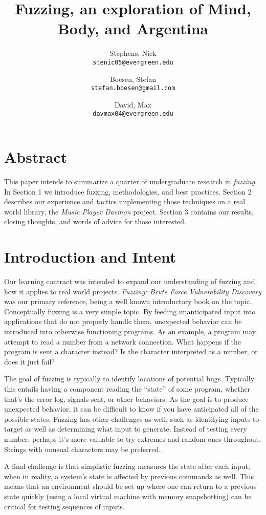 \documentclass[10pt]{article}
\author{
  Stephens, Nick\\
  \texttt{stenic05@evergreen.edu}
  \and
  Boesen, Stefan\\
  \texttt{stefan.boesen@gmail.com}
  \and
  David, Max\\
  \texttt{davmax04@evergreen.edu}
}
\title{Fuzzing, an exploration of Mind, Body, and Argentina}
\begin{document}
  \maketitle

\section*{Abstract}
This paper intends to summarize a quarter of undergraduate research in \emph{fuzzing}. In Section 1 we introduce fuzzing, methodologies, and best practices. Section 2 describes our experience and tactics implementing those techniques on a real world library, the \emph{Music Player Daemon} \cite{mpd} project. Section 3 contains our results, closing thoughts, and words of advice for those interested.

\section{Introduction and Intent}
Our learning contract was intended to expand our understanding of fuzzing and how it applies to real world projects. \emph{Fuzzing: Brute Force Vulnerability Discovery} \cite{sutton07} was our primary reference, being a well known introductory book on the topic. Conceptually fuzzing is a very simple topic. By feeding unanticipated input into applications that do not properly handle them, unexpected behavior can be introduced into otherwise functioning programs. As an example, a program may attempt to read a number from a network connection. What happens if the program is sent a character instead? Is the character interpreted as a number, or does it just fail? 

The goal of fuzzing is typically to identify locations of potential bugs. Typically this entails having a component reading the ``state'' of some program, whether that's the error log, signals sent, or other behaviors. As the goal is to produce unexpected behavior, it can be difficult to know if you have anticipated all of the possible states. Fuzzing has other challenges as well, such as identifying inputs to target as well as determining what input to generate. Instead of testing every number, perhaps it's more valuable to try extremes and random ones throughout. Strings with unusual characters may be preferred.

A final challenge is that simplistic fuzzing measures the state after each input, when in reality, a system's state is affected by previous commands as well. This means that an environment should be set up where one can return to a previous state quickly (using a local virtual machine with memory snapshotting) can be critical for testing sequences of inputs.
\end{document}
